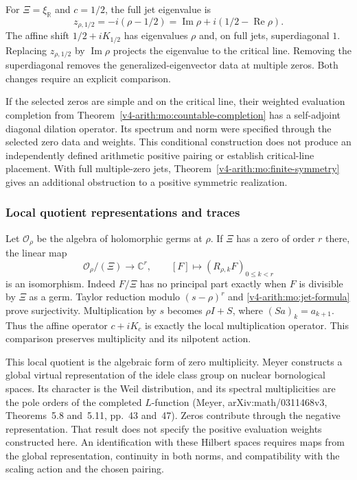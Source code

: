 For $\Xi=\xi_{\mathbb R}$ and $c=1/2$, the full jet eigenvalue is
\[
 z_{\rho,1/2}=-i(\rho-1/2)
       =\operatorname{Im}\rho+i(1/2-\operatorname{Re}\rho).
\]
The affine shift $1/2+iK_{1/2}$ has eigenvalues $\rho$ and, on
full jets, superdiagonal $1$. Replacing $z_{\rho,1/2}$ by
$\operatorname{Im}\rho$ projects the eigenvalue to the critical
line. Removing the superdiagonal removes the generalized-eigenvector
data at multiple zeros. Both changes require an explicit comparison.

If the selected zeros are simple and on the critical line, their
weighted evaluation completion from
Theorem~\ref{v4-arith:mo:countable-completion} has a self-adjoint diagonal dilation
operator. Its spectrum and norm were specified through the selected
zero data and weights. This conditional construction does not
produce an independently defined arithmetic positive pairing or
establish critical-line placement. With full multiple-zero jets,
Theorem~\ref{v4-arith:mo:finite-symmetry} gives an additional obstruction to a
positive symmetric realization.

\subsubsection{Local quotient representations and traces}

Let $\mathcal O_\rho$ be the algebra of holomorphic germs at
$\rho$. If $\Xi$ has a zero of order $r$ there, the linear map
\[
 \mathcal O_\rho/(\Xi)\longrightarrow\mathbb C^r,
 \qquad [F]\longmapsto(R_{\rho,k}F)_{0\leq k<r}
\]
is an isomorphism. Indeed $F/\Xi$ has no principal part exactly
when $F$ is divisible by $\Xi$ as a germ. Taylor reduction modulo
$(s-\rho)^r$ and \eqref{v4-arith:mo:jet-formula} prove surjectivity.
Multiplication by $s$ becomes $\rho I+S$, where
$(Sa)_k=a_{k+1}$. Thus the affine operator $c+iK_c$ is exactly
the local multiplication operator. This comparison preserves
multiplicity and its nilpotent action.

This local quotient is the algebraic form of zero multiplicity.
Meyer constructs a global virtual representation of the idele
class group on nuclear bornological spaces. Its character is
the Weil distribution, and its spectral multiplicities are the
pole orders of the completed $L$-function
(Meyer, arXiv:math/0311468v3, Theorems~5.8 and~5.11, pp.~43 and~47).
Zeros contribute through the negative representation. That result
does not specify the positive evaluation weights constructed here.
An identification with these Hilbert spaces requires maps from
the global representation, continuity in both norms, and compatibility
with the scaling action and the chosen pairing.

